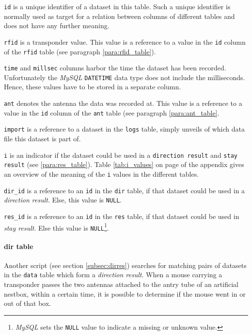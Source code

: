 \begin{mydesc}
  \item \lstinline|id| is a unique identifier of a dataset in this table. Such a unique identifier is normally used as target for a relation between columns of different tables and does not have any further meaning.
  \item \lstinline|rfid| is a transponder value. This value is a reference to a value in the \lstinline|id| column of the \lstinline|rfid| table (see paragraph \ref{para:rfid_table}).
  \item \lstinline|time| and \lstinline|millsec| columns harbor the time the dataset has been recorded. Unfortunately the \textit{MySQL} \lstinline|DATETIME| data type does not include the milliseconds. Hence, these values have to be stored in a separate column.
  \item \lstinline|ant| denotes the antenna the data was recorded at. This value is a reference to a value in the \lstinline|id| column of the \lstinline|ant| table (see paragraph \ref{para:ant_table}.
  \item \lstinline|import| is a reference to a dataset in the \lstinline|logs| table, simply unveils of which data file this dataset is part of.
  \item \lstinline|i| is an indicator if the dataset could be used in a \lstinline|direction result| and \lstinline|stay result| (see \ref{para:res_table}). Table \ref{tab:i_values} on page \pageref{tab:i_values} of the appendix gives an overview of the meaning of the \lstinline|i| values in the different tables.
  \item \lstinline|dir_id| is a reference to an \lstinline|id| in the \lstinline|dir| table, if that dataset could be used in a \textit{direction result}. Else, this value is \lstinline|NULL|.
  \item \lstinline|res_id| is a reference to an \lstinline|id| in the \lstinline|res| table, if that dataset could be used in \textit{stay result}. Else this value is \lstinline|NULL|\footnote{\textit{MySQL} sets the \lstinline|NULL| value to indicate a missing or unknown value.}.
\end{mydesc}

\paragraph{dir table}
\label{para:dir_table}

Another script (see section \ref{subsec:dirres}) searches for matching pairs of datasets in the \lstinline|data| table which form a \textit{direction result}. When a mouse carrying a transponder passes the two antennas attached to the antry tube of an artificial nestbox, within a certain time, it is possible to determine if the mouse went in or out of that box. 

